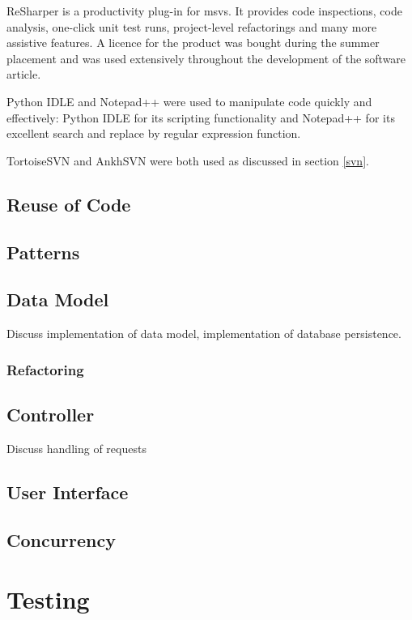 \documentclass{l4proj}
\begin{document}
ReSharper is a productivity plug-in for \gls{msvs}.  It provides code inspections, code analysis, one-click unit test runs, project-level refactorings and many more assistive features. A licence for the product was bought during the summer placement and was used extensively throughout the development of the software article.

Python IDLE and Notepad++ were used to manipulate code quickly and effectively: Python IDLE for its scripting functionality and Notepad++ for its excellent search and replace by regular expression function.

TortoiseSVN and AnkhSVN were both used as discussed in section \ref{svn}.

\section{Reuse of Code}



\section{Patterns}

\section{Data Model}
Discuss implementation of data model, implementation of database persistence.

\subsection{Refactoring}

\section{Controller}
Discuss handling of requests

\section{User Interface}

\section{Concurrency}


\chapter{Testing}
\label{testing}
\end{document}
